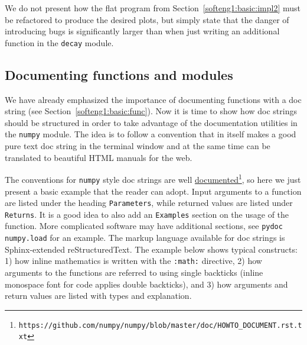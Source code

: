 \documentclass[graybox,sectrefs,envcountresetchap,open=right,final]{svmonodo}
\begin{document}
We do not present how the flat program from
Section~\ref{softeng1:basic:impl2} must be refactored to produce the
desired plots, but simply state that the danger of introducing bugs
is significantly larger than when just writing an additional function
in the \texttt{decay} module.

\subsection{Documenting functions and modules}
\label{softeng1:basic:docstring}

We have already emphasized the importance of documenting functions with
a doc string (see Section~\ref{softeng1:basic:func}). Now it is time
to show how doc strings should be structured in order to take advantage
of the documentation utilities in the \texttt{numpy} module. The idea is
to follow a convention that in itself makes a good pure text doc string
in the terminal window
and at the same time can be translated to beautiful HTML manuals for
the web.

The conventions for \texttt{numpy} style doc strings are well
\href{{https://github.com/numpy/numpy/blob/master/doc/HOWTO_DOCUMENT.rst.txt}}{documented}\footnote{\texttt{https://github.com/numpy/numpy/blob/master/doc/HOWTO\_DOCUMENT.rst.txt}}, so here we just present a basic example that the reader can adopt.
Input arguments to a function are listed under the heading \texttt{Parameters},
while returned values are listed under \texttt{Returns}. It is a good idea to
also add an \texttt{Examples} section on the usage of the function.
More complicated software may have additional sections, see \texttt{pydoc numpy.load}
for an example. The markup language available for doc strings is
Sphinx-extended reStructuredText. The example below shows typical
constructs: 1) how inline
mathematics is written with the \texttt{:math:} directive, 2) how arguments
to the functions are referred to using single backticks
(inline monospace font for code applies double backticks), and 3) how
arguments and return values are listed with types and explanation.
\end{document}

